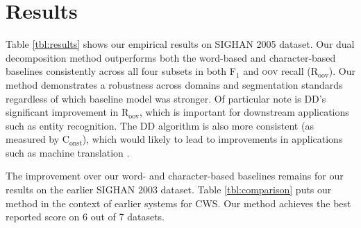 \section{Results}

Table \ref{tbl:results} shows our empirical results on SIGHAN 2005 dataset. Our dual decomposition method outperforms both the word-based and character-based baselines  consistently across all four subsets in both F$_1$ and \textsc{oov} recall (R$_{\mathrm{oov}}$). Our method demonstrates a robustness across domains and segmentation standards regardless of which baseline model was stronger. Of particular note is DD's significant improvement in R$_{\mathrm{oov}}$, which is important for downstream applications such as entity recognition. The DD algorithm is also more consistent (as measured by C$_{\mathrm{onst}}$), which would likely to lead to improvements in applications such as machine translation \cite{Chang:2008:ACL}. 

The improvement over our word- and character-based baselines remains for our results on the earlier SIGHAN 2003 dataset.
Table \ref{tbl:comparison} puts our method in the context of earlier systems for CWS. Our method achieves the best reported score on 6 out of 7 datasets.


